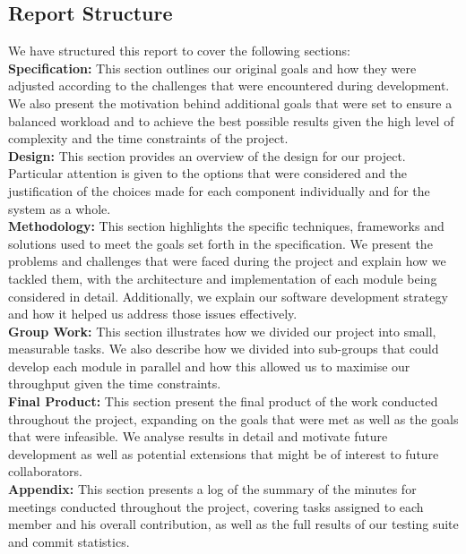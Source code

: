 \documentclass[a4paper,11pt]{article}
\begin{document}
\subsection{Report Structure}
We have structured this report to cover the following sections:\\

\noindent
\textbf{Specification:}
This section outlines our original goals and how they were adjusted according to the challenges that were encountered during development. We also present the motivation behind additional goals that were set to ensure a balanced workload and to achieve the best possible results given the high level of complexity and the time constraints of the project.\\

\noindent
\textbf{Design:} This section provides an overview of the design for our project. Particular attention is given to the options that were considered and the justification of the choices made for each component individually and for the system as a whole.\\

\noindent
\textbf{Methodology:} This section highlights the specific techniques, frameworks and solutions used to meet the goals set forth in the specification. We present the problems and challenges that were faced during the project and explain how we tackled them, with the architecture and implementation of each module being considered in detail. Additionally, we explain our software development strategy and how it helped us address those issues effectively.\\

\noindent
\textbf{Group Work:} This section illustrates how we divided our project into small, measurable tasks. We also describe how we divided into sub-groups that could develop each module in parallel and how this allowed us to maximise our throughput given the time constraints.\\

\noindent
\textbf{Final Product:} This section present the final product of the work conducted throughout the project, expanding on the goals that were met as well as the goals that were infeasible. We analyse results in detail and motivate future development as well as potential extensions that might be of interest to future collaborators.\\

\noindent
\textbf{Appendix:} This section presents a log of the summary of the minutes for meetings conducted throughout the project, covering tasks assigned to each member and his overall contribution, as well as the full results of our testing suite and commit statistics.
\end{document}
